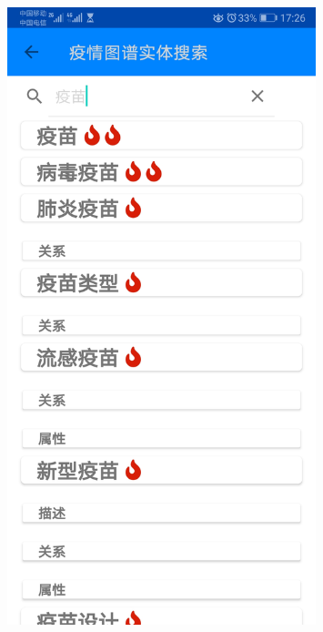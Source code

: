 \documentclass[UTF8]{article}
\begin{document}
\begin{figure}[htbp]
{\begin{minipage}[t]{0.25\linewidth}
    \includegraphics[width=0.8\textwidth]{searchentity3}
    \end{minipage}%
    }%
\end{figure}
\end{document}
